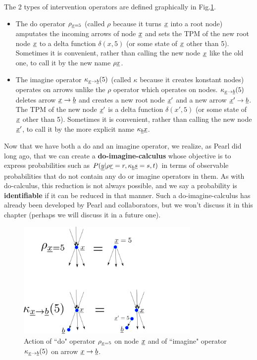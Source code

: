 The 2  types of
intervention operators
are defined 
graphically in Fig.\ref{fig-rho-kappa}.
\begin{itemize}
\item
The do operator $\rho_{{\underline{x}}=5}$
(called $\rho$ because  it turns ${\underline{x}}$
into a root node)
amputates
the incoming arrows of node ${\underline{x}}$
and sets the TPM
of the new root node ${\underline{x}}$
to a delta function $\delta(x, 5)$
(or some state of ${\underline{x}}$ other than 5).
Sometimes it is convenient,
rather than calling the
new node ${\underline{x}}$ like
the old one, to call
it by the new name $\rho{\underline{x}}$.
\item
The imagine operator 
$\kappa_{{\underline{x}}\rightarrow{\underline{b}}}(5)$
(called $\kappa$ because it
 creates konstant nodes)
operates on arrows
unlike the 
$\rho$ operator which operates on nodes.
$\kappa_{{\underline{x}}\rightarrow{\underline{b}}}(5)$
deletes
arrow ${\underline{x}}\rightarrow{\underline{b}}$
and
creates a new root node 
${\underline{x}}'$
and a new arrow
${\underline{x}}'\rightarrow {\underline{b}}$. The
TPM of the new node ${\underline{x}}'$ is a 
delta function $\delta(x', 5)$
(or some state of ${\underline{x}}$ other than 5).
Sometimes it is convenient,
rather than calling the
new node ${\underline{x}}'$, to call
it by the 
more
explicit name $\kappa_{\underline{b}}{\underline{x}}$.
\end{itemize}

Now that we have 
both a do and an imagine operator,
we realize,
as Pearl did long ago,
that we can create
a {\bf do-imagine-calculus}
whose
objective
is to 
express
probabilities such as 
$P({\underline{y}}|\rho{\underline{r}}=r, 
\kappa_{\underline{b}} {\underline{s}}=s, t)$
in terms of observable 
probabilities
that do not
contain
any do or imagine
operators in them.
As with
do-calculus,
this reduction
is not 
always possible,
and we say a probability is
{\bf identifiable}
if it  can be reduced
in that manner.
Such a do-imagine-calculus
has already
been developed
by Pearl and collaborators,
but
we won't 
discuss it in this chapter (perhaps
we  will discuss it
in a future one).


\begin{figure}[h!]
\centering
\includegraphics[width=3.5in]
{counterf/rho-kappa.png}
\caption{Action
of ``do" operator $\rho_{{\underline{x}}=5}$
on node ${\underline{x}}$
and of ``imagine" operator 
$\kappa_{{\underline{x}}\rightarrow {\underline{b}}}(5)$
on arrow ${\underline{x}}\rightarrow {\underline{b}}$.} 
\label{fig-rho-kappa}
\end{figure}


